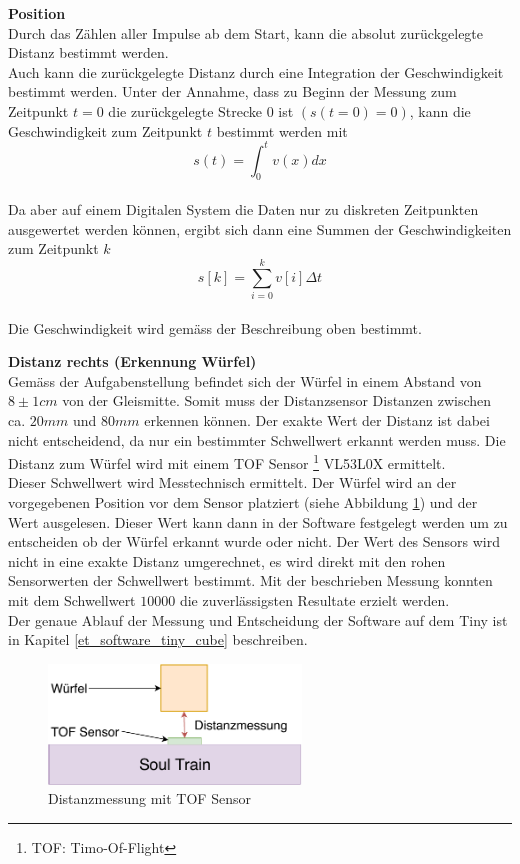 \documentclass[../../main.tex]{subfiles}
\begin{document}
    \textbf{Position}\\
    Durch das Zählen aller Impulse ab dem Start, kann die absolut zurückgelegte Distanz bestimmt werden. \\Auch kann die zurückgelegte Distanz durch eine Integration der Geschwindigkeit bestimmt werden. Unter der Annahme, dass zu Beginn der Messung zum Zeitpunkt $t = 0$ die zurückgelegte Strecke $0$ ist $(s(t=0) = 0)$, kann die Geschwindigkeit zum Zeitpunkt $t$ bestimmt werden mit $$s(t) = \int_{0}^{t} v(x) dx$$\\
    Da aber auf einem Digitalen System die Daten nur zu diskreten Zeitpunkten ausgewertet werden können, ergibt sich dann eine Summen der Geschwindigkeiten zum Zeitpunkt $k$ $$s[k] = \sum_{i=0}^{k}v[i] \Delta t$$\\
    Die Geschwindigkeit wird gemäss der Beschreibung oben bestimmt.


    \textbf{Distanz rechts (Erkennung Würfel) }\\
    Gemäss der Aufgabenstellung befindet sich der Würfel in einem Abstand von $8\pm1cm$ von der Gleismitte. Somit muss der Distanzsensor Distanzen zwischen ca. $20mm$ und $80mm$ erkennen können. Der exakte Wert der Distanz ist dabei nicht entscheidend, da nur ein bestimmter Schwellwert erkannt werden muss. Die Distanz zum Würfel wird mit einem TOF Sensor \footnote{TOF: Timo-Of-Flight} VL53L0X ermittelt. \\
    Dieser Schwellwert wird Messtechnisch ermittelt. Der Würfel wird an der vorgegebenen Position vor dem Sensor platziert (siehe Abbildung \ref{fig:et_tof_messung}) und der Wert ausgelesen. Dieser Wert kann dann in der Software festgelegt werden um zu entscheiden ob der Würfel erkannt wurde oder nicht. Der Wert des Sensors wird nicht in eine exakte Distanz umgerechnet, es wird direkt mit den rohen Sensorwerten der Schwellwert bestimmt. Mit der beschrieben Messung konnten mit dem Schwellwert $10000$ die zuverlässigsten Resultate erzielt werden.\\
    Der genaue Ablauf der Messung und Entscheidung der Software auf dem Tiny ist in Kapitel \ref{et_software_tiny_cube} beschreiben.\\

    \begin{figure}[H]
        \centering
        \includegraphics[width=0.6\textwidth]{../../images/et/et_tof_messung.pdf}
        \caption {Distanzmessung mit TOF Sensor}
        \label{fig:et_tof_messung}
    \end{figure}
\end{document}
